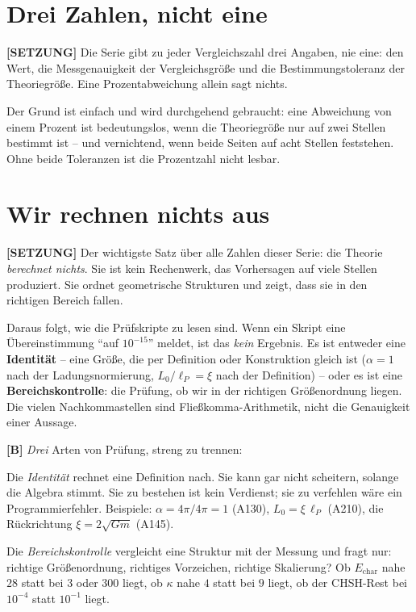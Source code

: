 \section{Drei Zahlen, nicht eine}

\textbf{[SETZUNG]} Die Serie gibt zu jeder Vergleichszahl drei Angaben, nie eine:
den Wert, die Messgenauigkeit der Vergleichsgröße und die Bestimmungstoleranz
der Theoriegröße. Eine Prozentabweichung allein sagt nichts.

Der Grund ist einfach und wird durchgehend gebraucht: eine Abweichung von einem
Prozent ist bedeutungslos, wenn die Theoriegröße nur auf zwei Stellen bestimmt
ist -- und vernichtend, wenn beide Seiten auf acht Stellen feststehen. Ohne
beide Toleranzen ist die Prozentzahl nicht lesbar.

\section{Wir rechnen nichts aus}

\textbf{[SETZUNG]} Der wichtigste Satz über alle Zahlen dieser Serie: die Theorie
\emph{berechnet nichts}. Sie ist kein Rechenwerk, das Vorhersagen auf viele
Stellen produziert. Sie ordnet geometrische Strukturen und zeigt, dass sie in den
richtigen Bereich fallen.

Daraus folgt, wie die Prüfskripte zu lesen sind. Wenn ein Skript eine
Übereinstimmung \enquote{auf $10^{-15}$} meldet, ist das \emph{kein} Ergebnis. Es
ist entweder eine \textbf{Identität} -- eine Größe, die per Definition oder
Konstruktion gleich ist ($\alpha = 1$ nach der Ladungsnormierung, $L_0/\ell_P =
\xi$ nach der Definition) -- oder es ist eine \textbf{Bereichskontrolle}: die
Prüfung, ob wir in der richtigen Größenordnung liegen. Die vielen Nachkommastellen
sind Fließkomma-Arithmetik, nicht die Genauigkeit einer Aussage.

\textbf{[B]} \emph{Drei} Arten von Prüfung, streng zu trennen:

Die \emph{Identität} rechnet eine Definition nach. Sie kann gar nicht scheitern,
solange die Algebra stimmt. Sie zu bestehen ist kein Verdienst; sie zu verfehlen
wäre ein Programmierfehler. Beispiele: $\alpha = 4\pi/4\pi = 1$ (A130), $L_0 =
\xi\,\ell_P$ (A210), die Rückrichtung $\xi = 2\sqrt{Gm}$ (A145).

Die \emph{Bereichskontrolle} vergleicht eine Struktur mit der Messung und fragt
nur: richtige Größenordnung, richtiges Vorzeichen, richtige Skalierung? Ob
$E_\text{char}$ nahe $28$ statt bei $3$ oder $300$ liegt, ob $\kappa$ nahe $4$
statt bei $9$ liegt, ob der CHSH-Rest bei $10^{-4}$ statt $10^{-1}$ liegt.

